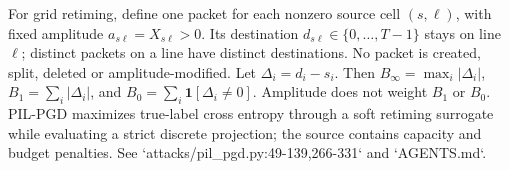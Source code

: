 For grid retiming, define one packet for each nonzero source cell $(s,\ell)$, with fixed amplitude $a_{s\ell}=X_{s\ell}>0$. Its destination $d_{s\ell}\in\{0,\ldots,T-1\}$ stays on line $\ell$; distinct packets on a line have distinct destinations. No packet is created, split, deleted or amplitude-modified. Let $\Delta_i=d_i-s_i$. Then $B_\infty=\max_i|\Delta_i|$, $B_1=\sum_i|\Delta_i|$, and $B_0=\sum_i\mathbf1[\Delta_i\ne0]$. Amplitude does not weight $B_1$ or $B_0$. PIL-PGD maximizes true-label cross entropy through a soft retiming surrogate while evaluating a strict discrete projection; the source contains capacity and budget penalties. See `attacks/pil_pgd.py:49-139,266-331` and `AGENTS.md`.
